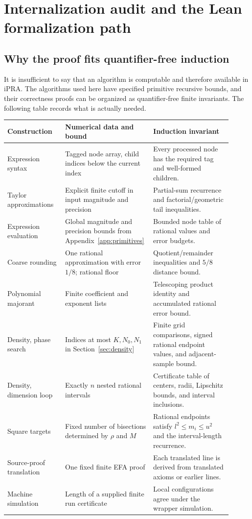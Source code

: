 \section{Internalization audit and the Lean formalization path}
\label{sec:formalization}

\subsection{Why the proof fits quantifier-free induction}

It is insufficient to say that an algorithm is computable and therefore
available in iPRA. The algorithms used here have specified primitive
recursive bounds, and their correctness proofs can be organized as
quantifier-free finite invariants. The following table records what is
actually needed.

\begin{longtable}{@{}p{0.25\linewidth}p{0.32\linewidth}p{0.34\linewidth}@{}}
\toprule
Construction & Numerical data and bound & Induction invariant\\
\midrule
\endhead
Expression syntax & Tagged node array, child indices below the current index & Every processed node has the required tag and well-formed children.\\
Taylor approximations & Explicit finite cutoff in input magnitude and precision & Partial-sum recurrence and factorial/geometric tail inequalities.\\
Expression evaluation & Global magnitude and precision bounds from Appendix~\ref{app:primitives} & Bounded node table of rational values and error budgets.\\
Coarse rounding & One rational approximation with error $1/8$; rational floor & Quotient/remainder inequalities and $5/8$ distance bound.\\
Polynomial majorant & Finite coefficient and exponent lists & Telescoping product identity and accumulated rational error bound.\\
Density, phase search & Indices at most $K,N_0,N_1$ in Section~\ref{sec:density} & Finite grid comparisons, signed rational endpoint values, and adjacent-sample bound.\\
Density, dimension loop & Exactly $n$ nested rational intervals & Certificate table of centers, radii, Lipschitz bounds, and interval inclusions.\\
Square targets & Fixed number of bisections determined by $\rho$ and $M$ & Rational endpoints satisfy $l^2\le m_i\le u^2$ and the interval-length recurrence.\\
Source-proof translation & One fixed finite EFA proof & Each translated line is derived from translated axioms or earlier lines.\\
Machine simulation & Length of a supplied finite run certificate & Local configurations agree under the wrapper simulation.\\
\bottomrule
\end{longtable}


